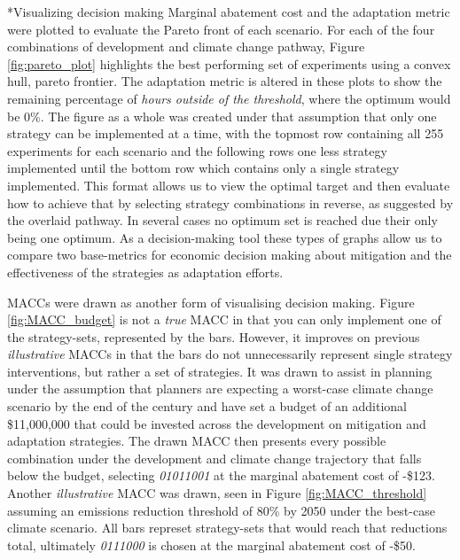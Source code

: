 \documentclass[twocolumn, a4paper,10pt]{article}
\makeatletter
\renewcommand\subsection{\@startsection{subsection}{1}{\z@}{\z@}{\z@}{\normalfont\normalsize\bfseries}}
\renewcommand\subsection{\@startsection{subsection}{1}{\z@}{\z@}{0.1pt}{\normalfont\normalsize\bfseries}}
\makeatother
\begin{document}
\subsection*{Visualizing decision making}
Marginal abatement cost and the adaptation metric were plotted to evaluate the Pareto front of each scenario. For each of the four combinations of development and climate change pathway, Figure \ref{fig:pareto_plot} highlights the best performing set of experiments using a convex hull, pareto frontier. The adaptation metric is altered in these plots to show the remaining percentage of \textit{hours outside of the threshold}, where the optimum would be 0\%. The figure as a whole was created under that assumption that only one strategy can be implemented at a time, with the topmost row containing all 255 experiments for each scenario and the following rows one less strategy implemented until the bottom row which contains only a single strategy implemented. This format allows us to view the optimal target and then evaluate how to achieve that by selecting strategy combinations in reverse, as suggested by the overlaid pathway. In several cases no optimum set is reached due their only being one optimum. As a decision-making tool these types of graphs allow us to compare two base-metrics for economic decision making about mitigation and the effectiveness of the strategies as adaptation efforts.

MACCs were drawn as another form of visualising decision making. Figure \ref{fig:MACC_budget} is not a \textit{true} MACC in that you can only implement one of the strategy-sets, represented by the bars. However, it improves on previous \textit{illustrative} MACCs in that the bars do not unnecessarily represent single strategy interventions, but rather a set of strategies. It was drawn to assist in planning under the assumption that planners are expecting a worst-case climate change scenario by the end of the century and have set a budget of an additional \$11,000,000 that could be invested across the development on mitigation and adaptation strategies. The drawn MACC then presents every possible combination under the development and climate change trajectory that falls below the budget, selecting \textit{01011001} at the marginal abatement cost of -\$123. Another \textit{illustrative} MACC was drawn, seen in Figure \ref{fig:MACC_threshold} assuming an emissions reduction threshold of 80\% by 2050 under the best-case climate scenario. All bars represet strategy-sets that would reach that reductions total, ultimately \textit{0111000} is chosen at the marginal abatement cost of -\$50.
\end{document}
